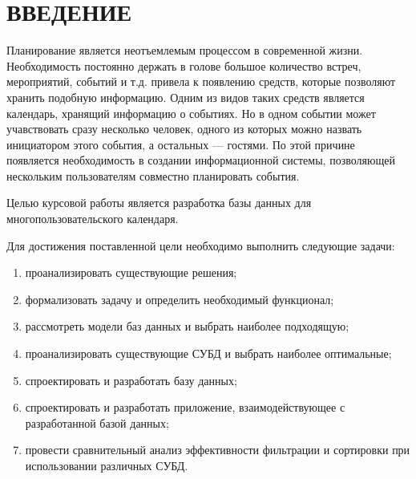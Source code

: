 \section*{ВВЕДЕНИЕ}

Планирование является неотъемлемым процессом в современной жизни. Необходимость постоянно держать в голове большое количество встреч, мероприятий, событий и т.д. привела к появлению средств, которые позволяют хранить подобную информацию. Одним из видов таких средств является календарь, хранящий информацию о событиях. Но в одном событии может учавствовать сразу несколько человек, одного из которых можно назвать инициатором этого события, а остальных --- гостями. По этой причине появляется необходимость в создании информационной системы, позволяющей нескольким пользователям совместно планировать события.

Целью курсовой работы является разработка базы данных для многопользовательского календаря. 

Для достижения поставленной цели необходимо выполнить следующие задачи:
\begin{enumerate}[label=\arabic*)]
	\item проанализировать существующие решения;
	\item формализовать задачу и определить необходимый функционал; 
	\item рассмотреть модели баз данных и выбрать наиболее подходящую; 
	\item проанализировать существующие СУБД и выбрать наиболее оптимальные; 
	\item спроектировать и разработать базу данных;
	\item спроектировать и разработать приложение, взаимодействующее с разработанной базой данных;
	\item провести сравнительный анализ эффективности фильтрации и сортировки при использовании различных СУБД.
\end{enumerate}